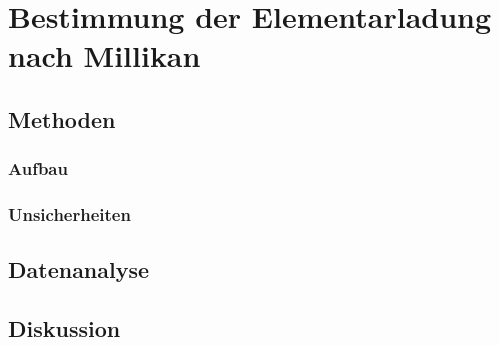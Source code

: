 \section{Bestimmung der Elementarladung nach Millikan} 


\subsection{Methoden}

\subsubsection{Aufbau}


\subsubsection{Unsicherheiten}


\subsection{Datenanalyse}


\subsection{Diskussion}


